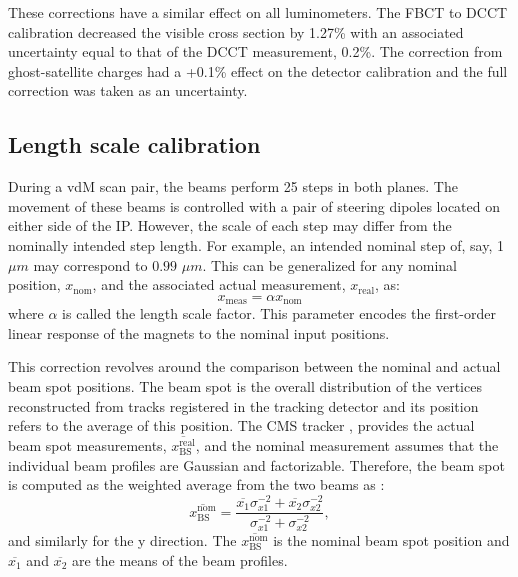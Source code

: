 These corrections have a similar effect on all luminometers. The FBCT to DCCT calibration decreased the visible cross section by 1.27\% with an associated uncertainty equal to that of the DCCT measurement, 0.2\%. The correction from ghost-satellite charges had a +0.1\% effect on the detector calibration and the full correction was taken as an uncertainty.

\subsection{Length scale calibration}

During a vdM scan pair, the beams perform 25 steps in both planes. The movement of these beams is controlled with a pair of steering dipoles located on either side of the IP. However, the scale of each step may differ from the nominally intended step length. For example, an intended nominal step of, say, 1 $\mu m$ may correspond to $0.99$ $\mu m$. This can be generalized for any nominal position, $x_{\mathrm{nom}}$, and the associated actual measurement, $x_{\mathrm{real}}$, as:
\begin{equation}
	x_{\mathrm{meas}} = \alpha x_{\mathrm{nom}}
\end{equation}
where $\alpha$ is called the length scale factor. This parameter encodes the first-order linear response of the magnets to the nominal input positions.

This correction revolves around the comparison between the nominal and actual beam spot positions. The beam spot is the overall distribution of the vertices reconstructed from tracks registered in the tracking detector and its position refers to the average of this position. The CMS tracker \cite{Sirunyan:2759951}, provides the actual beam spot measurements, $\overline{x^{\mathrm{real}}_{\mathrm{BS}}}$, and the nominal measurement assumes that the individual beam profiles are Gaussian and factorizable. Therefore, the beam spot is computed as the weighted average from the two beams as \cite{CMS-PAS-LUM-22-001}:
\begin{equation}
	\overline{x^{\mathrm{nom}}_{\mathrm{BS}}} = \frac{\overline{x_1}\sigma_{x1}^{-2} + \overline{x_2}\sigma_{x2}^{-2}}{\sigma_{x1}^{-2} + \sigma_{x2}^{-2}},
\end{equation}
and similarly for the y direction. The $\overline{x^{\mathrm{nom}}_{\mathrm{BS}}}$ is the nominal beam spot position and $\overline{x_1}$ and $\overline{x_2}$ are the means of the beam profiles.

